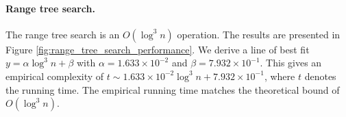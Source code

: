 \documentclass{article}
\newcommand{\figref}[1]{Figure \ref{#1}}
\begin{document}
\paragraph{Range tree search.} The range tree search is an $O(\log^3 n)$ operation. The results are presented in \figref{fig:range_tree_search_performance}. We derive a line of best fit $y = \alpha \log^3 n + \beta$ with $\alpha = 1.633 \times 10^{-2}$ and $\beta = 7.932 \times 10^{-1}$. This gives an empirical complexity of $t \sim 1.633 \times 10^{-2} \log^3 n + 7.932 \times 10^{-1}$, where $t$ denotes the running time. The empirical running time matches the theoretical bound of $O(\log^3 n)$.

\begin{figure}[h]
    \begin{floatrow}
    \end{floatrow}
\end{figure}
\end{document}
